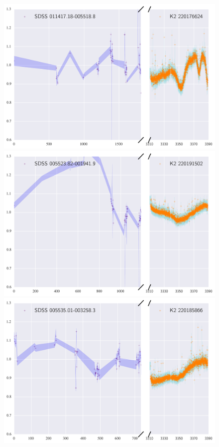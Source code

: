 \documentclass[a4paper,fleqn,usenatbib]{mnras}
\begin{document}
          \begin{figure}
 	\includegraphics[width=\columnwidth]{220176624ExtendedLC.png}
 	\includegraphics[width=\columnwidth]{220191502ExtendedLC.png}
 	\includegraphics[width=\columnwidth]{220185866ExtendedLC.png}
          	\caption{}
          	\label{fig:example_figure}
          \end{figure}
\end{document}
